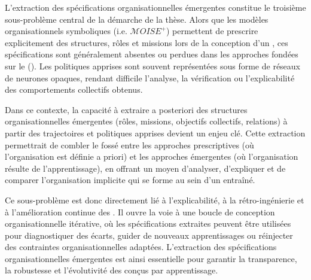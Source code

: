 L'extraction des spécifications organisationnelles émergentes constitue le troisième sous-problème central de la démarche de la thèse. Alors que les modèles organisationnels symboliques (i.e. $\mathcal{M}OISE^+$) permettent de prescrire explicitement des structures, rôles et missions lors de la conception d'un , ces spécifications sont généralement absentes ou perdues dans les approches fondées sur le  (). Les politiques apprises sont souvent représentées sous forme de réseaux de neurones opaques, rendant difficile l'analyse, la vérification ou l'explicabilité des comportements collectifs obtenus.

Dans ce contexte, la capacité à extraire a posteriori des structures organisationnelles émergentes (rôles, missions, objectifs collectifs, relations) à partir des trajectoires et politiques apprises devient un enjeu clé. Cette extraction permettrait de combler le fossé entre les approches prescriptives (où l'organisation est définie a priori) et les approches émergentes (où l'organisation résulte de l'apprentissage), en offrant un moyen d'analyser, d'expliquer et de comparer l'organisation implicite qui se forme au sein d'un  entraîné.

Ce sous-problème est donc directement lié à l'explicabilité, à la rétro-ingénierie et à l'amélioration continue des . Il ouvre la voie à une boucle de conception organisationnelle itérative, où les spécifications extraites peuvent être utilisées pour diagnostiquer des écarts, guider de nouveaux apprentissages ou réinjecter des contraintes organisationnelles adaptées. L'extraction des spécifications organisationnelles émergentes est ainsi essentielle pour garantir la transparence, la robustesse et l'évolutivité des  conçus par apprentissage.

